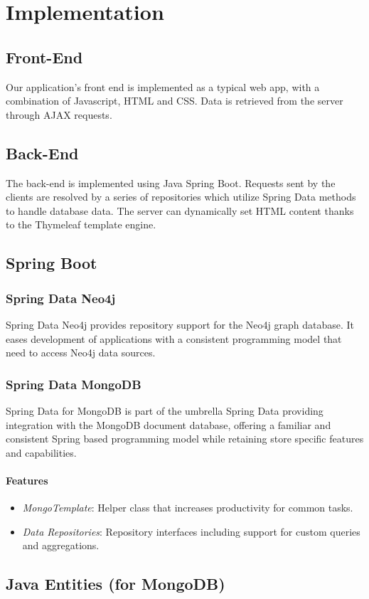 \chapter{Implementation}
\section{Front-End}
Our application's front end is implemented as a typical web app, with a combination of Javascript, HTML and CSS. Data is retrieved from the server through AJAX requests.
\section{Back-End}
The back-end is implemented using Java Spring Boot. Requests sent by the clients are resolved by a series of repositories which utilize Spring Data methods to handle database data.
The server can dynamically set HTML content thanks to the Thymeleaf template engine.
\section{Spring Boot}
\subsection{Spring Data Neo4j}
Spring Data Neo4j provides repository support for the Neo4j graph database. It eases development of applications with a consistent programming model that need to access Neo4j data sources.
\subsection{Spring Data MongoDB}
Spring Data for MongoDB is part of the umbrella Spring Data providing integration with the MongoDB document database, offering a familiar and consistent Spring based programming model while retaining store specific features and capabilities.
\subsubsection{Features}
\begin{itemize}
	\item \emph{MongoTemplate}: Helper class that increases productivity for common tasks.
	\item \emph{Data Repositories}: Repository interfaces including support for custom queries and aggregations.
\end{itemize}
\section{Java Entities (for MongoDB)}
